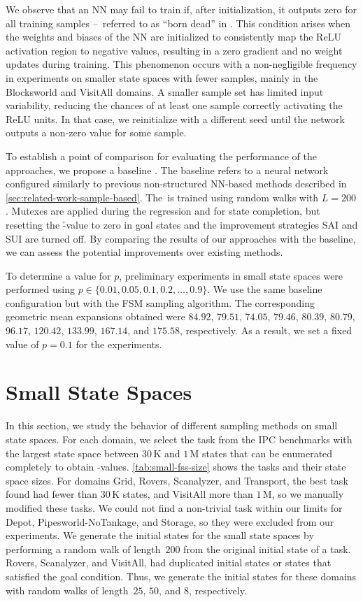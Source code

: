 We observe that an NN may fail to train if, after initialization, it outputs zero for all training samples --~referred to as ``born dead'' in \citet{lu2020dying}. This condition arises when the weights and biases of the NN are initialized to consistently map the ReLU activation region to negative values, resulting in a zero gradient and no weight updates during training. This phenomenon occurs with a non-negligible frequency in experiments on smaller state spaces with fewer samples, mainly in the Blocksworld and VisitAll domains. A smaller sample set has limited input variability, reducing the chances of at least one sample correctly activating the ReLU units. In that case, we reinitialize with a different seed until the network outputs a non-zero value for some sample.

To establish a point of comparison for evaluating the performance of the approaches, we propose a baseline \hnnbase. The baseline refers to a neural network configured similarly to previous non-structured NN-based methods described in \cref{sec:related-work-sample-based}. The~\hnnbase is trained using random walks with $L=200$. Mutexes are applied during the regression and for state completion, but resetting the \h-value to zero in goal states and the improvement strategies SAI and SUI are turned off. By comparing the results of our approaches with the baseline, we can assess the potential improvements over existing methods.

To determine a value for $p$, preliminary experiments in small state spaces were performed using $p\in\{0.01,0.05,0.1,0.2,\ldots,0.9\}$. We use the same baseline configuration but with the FSM sampling algorithm. The corresponding geometric mean expansions obtained were $84.92$, $79.51$, $74.05$, $79.46$, $80.39$, $80.79$, $96.17$, $120.42$, $133.99$, $167.14$, and $175.58$, respectively. As a result, we set a fixed value of $p = 0.1$ for the experiments.

\section{Small State Spaces}
\label{sec:small-experiments}

In this section, we study the behavior of different sampling methods on small state spaces. For each domain, we select the task from the IPC benchmarks with the largest state space between $30$\,K and $1$\,M states that can be enumerated completely to obtain \mbox{\hstar-values}. \cref{tab:small-fss-size} shows the tasks and their state space sizes. For domains Grid, Rovers, Scanalyzer, and Transport, the best task found had fewer than $30$\,K states, and VisitAll more than $1$\,M, so we manually modified these tasks. We could not find a non-trivial task within our limits for Depot, Pipesworld-NoTankage, and Storage, so they were excluded from our experiments. We generate the initial states for the small state spaces by performing a random walk of length~$200$ from the original initial state of a task. Rovers, Scanalyzer, and VisitAll, had duplicated initial states or states that satisfied the goal condition. Thus, we generate the initial states for these domains with random walks of length~$25$, $50$, and $8$, respectively.

